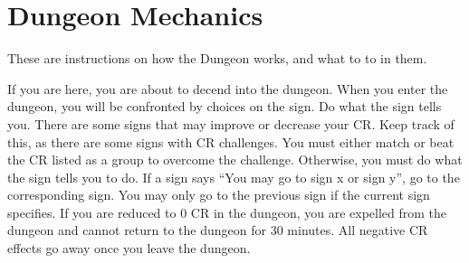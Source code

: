 \documentclass[green]{guildcamp2}
\begin{document}
\name{\gDungeonDirections{}}

\section{Dungeon Mechanics}
These are instructions on how the Dungeon works, and what to to in them.

\begin{enum}[Directions]
	\item If you are here, you are about to decend into the dungeon. When you enter the dungeon, you will be confronted by choices on the sign. Do what the sign tells you. There are some signs that may improve or decrease your CR. Keep track of this, as there are some signs with CR challenges. You must either match or beat the CR listed as a group to overcome the challenge. Otherwise, you must do what the sign tells you to do. If a sign says "`You may go to sign x or sign y"', go to the corresponding sign. You may only go to the previous sign if the current sign specifies. If you are reduced to 0 CR in the dungeon, you are expelled from the dungeon and cannot return to the dungeon for 30 minutes. All negative CR effects go away once you leave the dungeon.
\end{enum}
	
\end{document}
